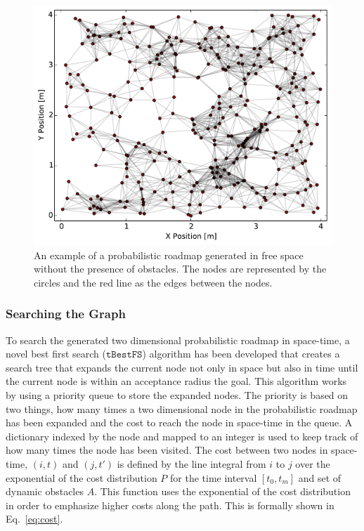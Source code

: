 \documentclass[letterpaper, 10pt, conference]{ieeeconf}
\newcommand{\Acronym}[1]{\ensuremath{{{\texttt{#1}}}}}
\begin{document}
\begin{figure}[h!]
    \centering
    \includegraphics[width=0.8\linewidth]{figs/roadmap}

    \caption{An example of a probabilistic roadmap generated in free space
    without the presence of obstacles. The nodes are represented by the circles
and the red line as the edges between the nodes.}

    \label{fig:prm}
\end{figure}

\subsubsection{Searching the Graph}

To search the generated two dimensional probabilistic roadmap in space-time, a
novel best first search ($\Acronym{tBestFS}$) algorithm has been developed that
creates a search tree that expands the current node not only in space but also
in time until the current node is within an acceptance radius the goal. This
algorithm works by using a priority queue to store the expanded nodes. The
priority is based on two things, how many times a two dimensional node in the
probabilistic roadmap has been expanded and the cost to reach the node in
space-time in the queue. A dictionary indexed by the node and mapped to an
integer is used to keep track of how many times the node has been visited. The
cost between two nodes in space-time, $(i, t)$ and $(j, t')$ is defined by the
line integral from $i$ to $j$ over the exponential of the cost distribution $P$
for the time interval $[t_0, t_m]$ and set of dynamic obstacles $A$. This
function uses the exponential of the cost distribution in order to emphasize
higher costs along the path. This is formally shown in Eq.~\ref{eq:cost}.
\end{document}
